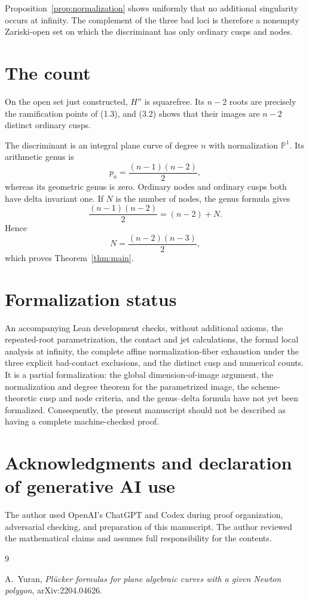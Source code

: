 \documentclass[11pt]{article}
\newcommand{\Pone}{\mathbb P^1}
\begin{document}
Proposition~\ref{prop:normalization} shows uniformly that no additional
singularity occurs at infinity.  The complement of the three bad loci is
therefore a nonempty Zariski-open set on which the discriminant has only
ordinary cusps and nodes.

\section{The count}

On the open set just constructed, \(H''\) is squarefree.  Its \(n-2\) roots
are precisely the ramification points of (1.3), and (3.2) shows that their
images are \(n-2\) distinct ordinary cusps.

The discriminant is an integral plane curve of degree \(n\) with
normalization \(\Pone\).  Its arithmetic genus is
\[
  p_a=\frac{(n-1)(n-2)}2,
\]
whereas its geometric genus is zero.  Ordinary nodes and ordinary cusps
both have delta invariant one.  If \(N\) is the number of nodes, the genus
formula gives
\[
  \frac{(n-1)(n-2)}2=(n-2)+N.
\]
Hence
\[
  N=\frac{(n-2)(n-3)}2,
\]
which proves Theorem~\ref{thm:main}.

\section*{Formalization status}

An accompanying Lean development checks, without additional axioms, the
repeated-root parametrization, the contact and jet calculations, the formal
local analysis at infinity, the complete affine normalization-fiber
exhaustion under the three explicit bad-contact exclusions, and the distinct
cusp and numerical counts.
It is a partial formalization: the global dimension-of-image argument,
the normalization and degree theorem for the parametrized image, the
scheme-theoretic cusp and node criteria, and the genus--delta formula have
not yet been formalized.  Consequently, the present manuscript should not
be described as having a complete machine-checked proof.

\section*{Acknowledgments and declaration of generative AI use}

The author used OpenAI's ChatGPT and Codex during proof organization,
adversarial checking, and preparation of this manuscript.  The author
reviewed the mathematical claims and assumes full responsibility for the
contents.

\begin{thebibliography}{9}

A.~Yuran,
\emph{Pl\"ucker formulas for plane algebraic curves with a given Newton
polygon},
arXiv:2204.04626.

\end{thebibliography}
\end{document}
